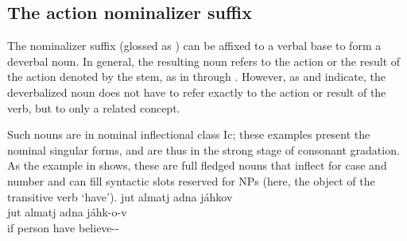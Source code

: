 \subsection{The action nominalizer suffix }\label{nmlz1}
The nominalizer suffix  (glossed as ) can be affixed to a verbal base to form a deverbal noun. %
In general, the resulting noun refers to the action or the result of the action denoted by the stem, as in  through . 
\ea\label{NMLZ1ex1}
\z
\ea\label{NMLZ1ex3b}
\z
\ea\label{NMLZ1ex4}
\z
\ea\label{NMLZ1ex5}
\z
\ea\label{NMLZ1ex6}
\z
\ea\label{NMLZ1ex7}
\z
However, as  and  indicate, the deverbalized noun does not have to refer exactly to the action or result of the verb, but to only a related concept. 
\ea\label{NMLZ1ex2}
\z
\ea\label{NMLZ1ex3a}
\z

Such nouns are in nominal inflectional class Ic; these examples present the nominal singular forms, and are thus in the strong stage of consonant gradation. 
As the example in  shows, these are full fledged nouns that inflect for case and number and can fill syntactic slots reserved for NPs (here, the object of the transitive verb  ‘have’).
\ea\label{nominalizerEx1}
\glll	jut almatj adna jáhkov\\
	jut almatj adna jáhk-o-v\\
	if person\BS{} have\BS{} believe--\\\nopagebreak
{}	
\z




